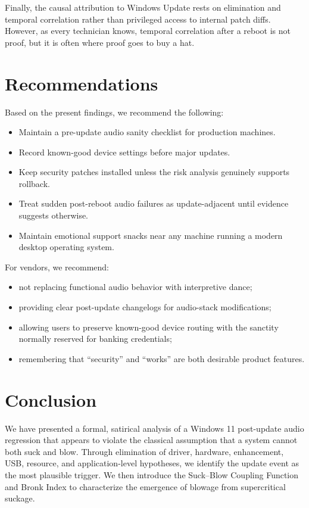 \documentclass[10pt,twocolumn]{article}
\begin{document}
Finally, the causal attribution to Windows Update rests on elimination and temporal correlation rather than privileged access to internal patch diffs. However, as every technician knows, temporal correlation after a reboot is not proof, but it is often where proof goes to buy a hat.

\section{Recommendations}

Based on the present findings, we recommend the following:

\begin{itemize}
\item Maintain a pre-update audio sanity checklist for production machines.
\item Record known-good device settings before major updates.
\item Keep security patches installed unless the risk analysis genuinely supports rollback.
\item Treat sudden post-reboot audio failures as update-adjacent until evidence suggests otherwise.
\item Maintain emotional support snacks near any machine running a modern desktop operating system.
\end{itemize}

For vendors, we recommend:
\begin{itemize}
\item not replacing functional audio behavior with interpretive dance;
\item providing clear post-update changelogs for audio-stack modifications;
\item allowing users to preserve known-good device routing with the sanctity normally reserved for banking credentials;
\item remembering that ``security'' and ``works'' are both desirable product features.
\end{itemize}

\section{Conclusion}

We have presented a formal, satirical analysis of a Windows 11 post-update audio regression that appears to violate the classical assumption that a system cannot both suck and blow. Through elimination of driver, hardware, enhancement, USB, resource, and application-level hypotheses, we identify the update event as the most plausible trigger. We then introduce the Suck--Blow Coupling Function and Bronk Index to characterize the emergence of blowage from supercritical suckage.
\end{document}
